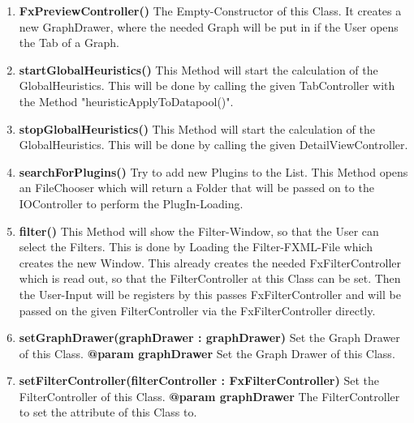 \documentclass{article}
\begin{document}
				\begin{enumerate}[+]
					\item{
						\textbf{FxPreviewController()} \newline
						The Empty-Constructor of this Class.
						It creates a new GraphDrawer, where the needed Graph will be put in if the User opens the Tab of a Graph.
						\newline
					}
					\item{
						\textbf{startGlobalHeuristics()} \newline
						This Method will start the calculation of the GlobalHeuristics.
						This will be done by calling the given TabController with the Method "heuristicApplyToDatapool()".
						\newline
					}
					\item{
						\textbf{stopGlobalHeuristics()} \newline
						This Method will start the calculation of the GlobalHeuristics.
						This will be done by calling the given DetailViewController.
						\newline
					}
					\item{
						\textbf{searchForPlugins()} \newline
						Try to add new Plugins to the List.
						This Method opens an FileChooser which will return a Folder that will be passed on to the IOController to perform the PlugIn-Loading.
						\newline
					}
					\item{
						\textbf{filter()} \newline
						This Method will show the Filter-Window, so that the User can select the Filters.
						This is done by Loading the Filter-FXML-File which creates the new Window.
						This already creates the needed FxFilterController which is read out, so that the FilterController at this Class can be set.
						Then the User-Input will be registers by this passes FxFilterController and will be passed on the given FilterController via the FxFilterController directly.
						\newline
					}
					\item{
						\textbf{setGraphDrawer(graphDrawer : graphDrawer)} \newline
						Set the Graph Drawer of this Class.
						\newline
						\textbf{@param graphDrawer}
							Set the Graph Drawer of this Class.
							\newline
					}
					\item{
						\textbf{setFilterController(filterController : FxFilterController)} \newline
						Set the FilterController of this Class.
						\newline
						\textbf{@param graphDrawer}
						The FilterController to set the attribute of this Class to.
						\newline
					}
				\end{enumerate}
			
\end{document}
